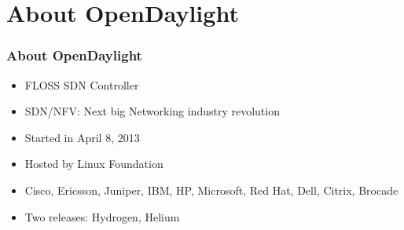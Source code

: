 \section{About OpenDaylight}

\begin{frame}[allowframebreaks]
\frametitle{About OpenDaylight}

\begin{itemize}
	\item FLOSS SDN Controller
 \item SDN/NFV: Next big Networking industry revolution
	\item Started in April 8, 2013
	\item Hosted by Linux Foundation
	\item Cisco, Ericsson, Juniper, IBM, HP, Microsoft, Red Hat, Dell, Citrix, Brocade
	\item Two releases: Hydrogen, Helium
\end{itemize}

\end{frame}
